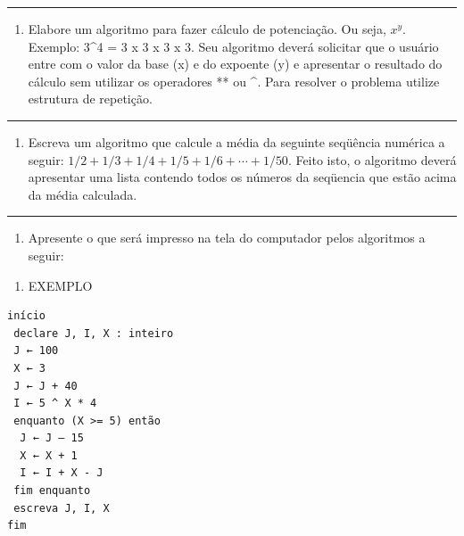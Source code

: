 \documentclass[12pt,a4paper]{article}
\renewcommand{\linethickness}{0.05em}
\providecommand{\tightlist}{%
      \setlength{\itemsep}{0pt}\setlength{\parskip}{0pt}}
\begin{document}
    \begin{center}\rule{0.5\linewidth}{\linethickness}\end{center}

\begin{enumerate}
\def\labelenumi{\arabic{enumi}.}
\setcounter{enumi}{1}
\tightlist
\item
  Elabore um algoritmo para fazer cálculo de potenciação. Ou seja,
  \(x^y\). Exemplo: 3\^{}4 = 3 x 3 x 3 x 3. Seu algoritmo deverá
  solicitar que o usuário entre com o valor da base (x) e do expoente
  (y) e apresentar o resultado do cálculo sem utilizar os operadores **
  ou \^{}. Para resolver o problema utilize estrutura de repetição.
\end{enumerate}

    \begin{center}\rule{0.5\linewidth}{\linethickness}\end{center}

\begin{enumerate}
\def\labelenumi{\arabic{enumi}.}
\setcounter{enumi}{2}
\tightlist
\item
  Escreva um algoritmo que calcule a média da seguinte seqüência
  numérica a seguir: \(1/2 + 1/3 + 1/4 + 1/5 + 1/6 + \cdots + 1/50\).
  Feito isto, o algoritmo deverá apresentar uma lista contendo todos os
  números da seqüencia que estão acima da média calculada.
\end{enumerate}

    \begin{center}\rule{0.5\linewidth}{\linethickness}\end{center}

\begin{enumerate}
\def\labelenumi{\arabic{enumi}.}
\setcounter{enumi}{3}
\tightlist
\item
  Apresente o que será impresso na tela do computador pelos algoritmos a
  seguir:
\end{enumerate}

\begin{enumerate}
\def\labelenumi{\alph{enumi})}
\tightlist
\item
  EXEMPLO
\end{enumerate}

\begin{verbatim}
início
 declare J, I, X : inteiro
 J ← 100
 X ← 3
 J ← J + 40
 I ← 5 ^ X * 4
 enquanto (X >= 5) então
  J ← J – 15
  X ← X + 1
  I ← I + X - J
 fim enquanto
 escreva J, I, X
fim
\end{verbatim}
\end{document}
